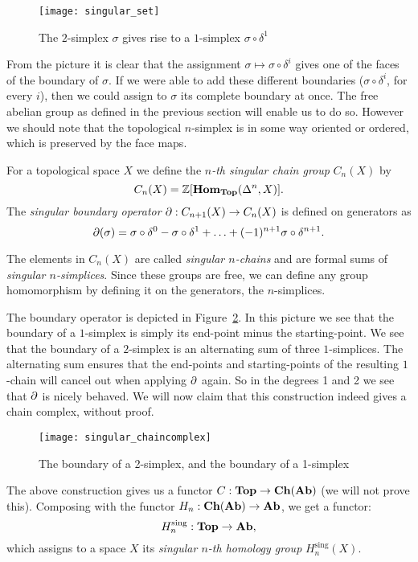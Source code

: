 \begin{figure}[h!]
	\texttt{[image: singular\_set]}
	\caption{The $2$-simplex $\sigma$ gives rise to a $1$-simplex $\sigma \circ \delta^1$}
	\label{fig:diagram_d}
\end{figure}

From the picture it is clear that the assignment $\sigma \mapsto \sigma \circ \delta^i$ gives one of the faces of the boundary of $\sigma$. If we were able to add these different boundaries ($\sigma \circ \delta^i$, for every $i$), then we could assign to $\sigma$ its complete boundary at once. The free abelian group as defined in the previous section will enable us to do so. However we should note that the topological $n$-simplex is in some way oriented or ordered, which is preserved by the face maps.

\begin{definition}
	For a topological space $X$ we define the \emph{$n$-th singular chain group} $C_n(X)$ by
	$$ C_n(X) = \mathbb{Z}[\mathbf{Hom}_{\mathbf{Top}}(\Delta^n, X)]. $$
	The \emph{singular boundary operator} $\partial : C_{n+1}(X) \to C_n(X)$ is defined on generators as
	$$ \partial(\sigma) = \sigma \circ \delta^0 - \sigma \circ \delta^1 + \ldots + (-1)^{n+1} \sigma \circ \delta^{n+1}.$$
\end{definition}

The elements in $C_n(X)$ are called \emph{singular $n$-chains} and are formal sums of \emph{singular $n$-simplices}. Since these groups are free, we can define any group homomorphism by defining it on the generators, the $n$-simplices.

The boundary operator is depicted in Figure~\ref{fig:singular_chaincomplex}. In this picture we see that the boundary of a $1$-simplex is simply its end-point minus the starting-point. We see that the boundary of a $2$-simplex is an alternating sum of three $1$-simplices. The alternating sum ensures that the end-points and starting-points of the resulting $1$-chain will cancel out when applying $\partial$ again. So in the degrees 1 and 2 we see that $\partial$ is nicely behaved. We will now claim that this construction indeed gives a chain complex, without proof.
\begin{figure}[h!]
	\texttt{[image: singular\_chaincomplex]}
	\caption{The boundary of a 2-simplex, and the boundary of a 1-simplex}
	\label{fig:singular_chaincomplex}
\end{figure}

The above construction gives us a functor $C: \mathbf{Top} \to \mathbf{Ch}(\mathbf{Ab})$ (we will not prove this). Composing with the functor $H_n: \mathbf{Ch}(\mathbf{Ab}) \to \mathbf{Ab}$, we get a functor:
$$ H^\text{sing}_n : \mathbf{Top} \to \mathbf{Ab}, $$
which assigns to a space $X$ its \emph{singular $n$-th homology group} $H^\text{sing}_n(X)$.

